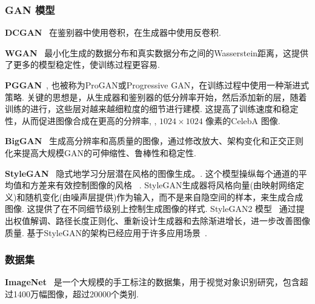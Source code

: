 \subsubsection{GAN 模型} 
\label{sec:gan models}

\noindent\textbf{DCGAN}~\cite{radford2016dcgan} 在鉴别器中使用卷积，在生成器中使用反卷积. \par

\vspace{1mm}
\noindent\textbf{WGAN}~\cite{gulrajani2017improved} 最小化生成的数据分布和真实数据分布之间的Wasserstein距离，这提供了更多的模型稳定性，使训练过程更容易.\par

\vspace{1mm}
\noindent\textbf{PGGAN}~\cite{karras2017progressive}, 也被称为ProGAN或Progressive GAN，在训练过程中使用一种渐进式策略. 
关键的思想是，从生成器和鉴别器的低分辨率开始，然后添加新的层，随着训练的进行，这些层对越来越细粒度的细节进行建模. 
这提高了训练速度和稳定性，从而促进图像合成在更高的分辨率, \eg, $1024 \times 1024$ 像素的CelebA 图像. \par

\vspace{1mm}
\noindent\textbf{BigGAN}~\cite{brock2018large} 生成高分辨率和高质量的图像，通过修改放大、架构变化和正交正则化来提高大规模GAN的可伸缩性、鲁棒性和稳定性.\par

\vspace{1mm}
\noindent\textbf{StyleGAN}~\cite{karras2019style} 隐式地学习分层潜在风格的图像生成。. 
这个模型操纵每个通道的平均值和方差来有效控制图像的风格~\cite{huang2017adain} .
StyleGAN生成器将风格向量(由映射网络定义)和随机变化(由噪声层提供)作为输入，而不是来自隐空间的样本，来生成合成图像. 
这提供了在不同细节级别上控制生成图像的样式.
StyleGAN2 模型~\cite{karras2020analyzing} 通过提出权值解调、路径长度正则化、重新设计生成器和去除渐进增长，进一步改善图像质量. 
基于StyleGAN的架构已经应用于许多应用场景~\cite{gabbay2019style,zhu2020sean,zhu2020semantically}.\par

\subsubsection{数据集}
\label{sec:datasets}

\vspace{1mm}
\noindent\textbf{ImageNet}~\cite{russakovsky2015imagenet} 是一个大规模的手工标注的数据集，用于视觉对象识别研究，包含超过1400万幅图像，超过20000个类别.\par

